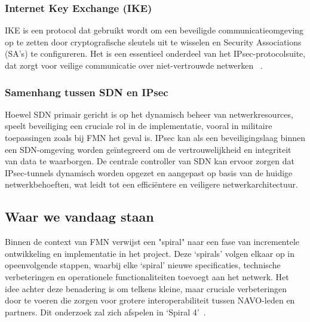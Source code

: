 \subsubsection{Internet Key Exchange (IKE)}
IKE is een protocol dat gebruikt wordt om een beveiligde communicatieomgeving op te zetten door cryptografische sleutels uit te wisselen en  Security Associations (SA's) te configureren. Het is een essentieel onderdeel van het IPsec-protocolsuite, dat zorgt voor veilige communicatie over niet-vertrouwde netwerken ~\autocite{IKE}.

\subsubsection{Samenhang tussen SDN en IPsec}
Hoewel SDN primair gericht is op het dynamisch beheer van netwerkresources, speelt beveiliging een cruciale rol in de implementatie, vooral in militaire toepassingen zoals bij FMN het geval is. IPsec kan als een beveiligingslaag binnen een SDN-omgeving worden geïntegreerd om de vertrouwelijkheid en integriteit van data te waarborgen. De centrale controller van SDN kan ervoor zorgen dat IPsec-tunnels dynamisch worden opgezet en aangepast op basis van de huidige netwerkbehoeften, wat leidt tot een efficiëntere en veiligere netwerkarchitectuur.

\subsection{Waar we vandaag staan}
Binnen de context van FMN verwijst een "spiral" naar een fase van incrementele ontwikkeling en implementatie in het project. Deze ‘spirals’ volgen elkaar op in opeenvolgende stappen, waarbij elke ‘spiral’ nieuwe specificaties, technische verbeteringen en operationele functionaliteiten toevoegt aan het netwerk. Het idee achter deze benadering is om telkens kleine, maar cruciale verbeteringen door te voeren die zorgen voor grotere interoperabiliteit tussen NAVO-leden en partners. Dit onderzoek zal zich afspelen in ‘Spiral 4’~\autocite{Spiral4}.


